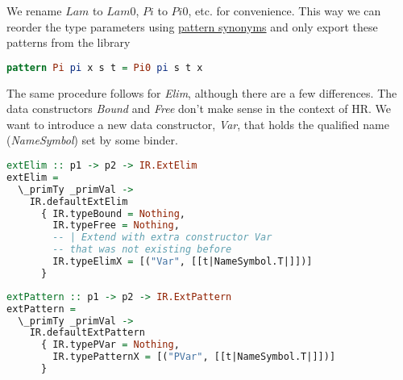 \documentclass[acmsmall]{acmart}
\numberwithin{figure}{subsection}
\begin{document}
We rename $Lam$ to $Lam0$, $Pi$ to $Pi0$, etc. for convenience. This way we can reorder the type parameters using \href{https://ghc.gitlab.haskell.org/ghc/doc/users_guide/exts/pattern_synonyms.html}{pattern synonyms} and only export these patterns from the library


\begin{lstlisting}[language=haskell]
pattern Pi pi x s t = Pi0 pi s t x
\end{lstlisting}

The same procedure follows for \textit{Elim}, although there are a few differences. The data constructors \textit{Bound} and \textit{Free} don't make sense in the context of HR. We want to introduce a new data constructor, \textit{Var}, that holds the qualified name (\textit{NameSymbol}) set by some binder.

\begin{lstlisting}[language=haskell]
extElim :: p1 -> p2 -> IR.ExtElim
extElim =
  \_primTy _primVal ->
    IR.defaultExtElim
      { IR.typeBound = Nothing,
        IR.typeFree = Nothing,
        -- | Extend with extra constructor Var 
        -- that was not existing before
        IR.typeElimX = [("Var", [[t|NameSymbol.T|]])]
      }
\end{lstlisting}


\begin{lstlisting}[language=haskell]
extPattern :: p1 -> p2 -> IR.ExtPattern
extPattern =
  \_primTy _primVal ->
    IR.defaultExtPattern
      { IR.typePVar = Nothing,
        IR.typePatternX = [("PVar", [[t|NameSymbol.T|]])]
      }
\end{lstlisting}



\end{document}
